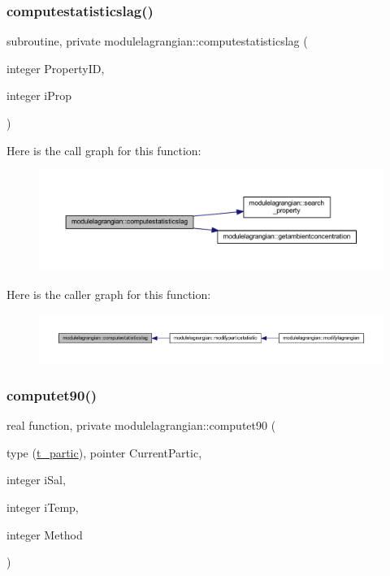 \subsubsection{\texorpdfstring{computestatisticslag()}{computestatisticslag()}}
{\footnotesize\ttfamily subroutine, private modulelagrangian\+::computestatisticslag (\begin{DoxyParamCaption}\item[{integer}]{Property\+ID,  }\item[{integer}]{i\+Prop }\end{DoxyParamCaption})\hspace{0.3cm}{\ttfamily [private]}}

Here is the call graph for this function\+:\nopagebreak
\begin{figure}[H]
\begin{center}
\leavevmode
\includegraphics[width=350pt]{namespacemodulelagrangian_afbe53c51100e0ccf05c86c57cde70d49_cgraph}
\end{center}
\end{figure}
Here is the caller graph for this function\+:\nopagebreak
\begin{figure}[H]
\begin{center}
\leavevmode
\includegraphics[width=350pt]{namespacemodulelagrangian_afbe53c51100e0ccf05c86c57cde70d49_icgraph}
\end{center}
\end{figure}
\mbox{\label{namespacemodulelagrangian_ab2c379c41effe9b3eef3129449039ace}} 
\subsubsection{\texorpdfstring{computet90()}{computet90()}}
{\footnotesize\ttfamily real function, private modulelagrangian\+::computet90 (\begin{DoxyParamCaption}\item[{type (\mbox{\hyperlink{structmodulelagrangian_1_1t__partic}{t\+\_\+partic}}), pointer}]{Current\+Partic,  }\item[{integer}]{i\+Sal,  }\item[{integer}]{i\+Temp,  }\item[{integer}]{Method }\end{DoxyParamCaption})\hspace{0.3cm}{\ttfamily [private]}}


